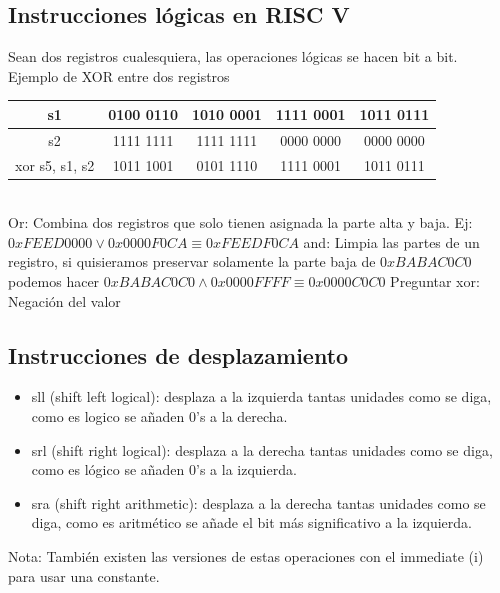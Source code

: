 \documentclass[10pt,a4paper]{article}
\begin{document}
\subsection*{Instrucciones lógicas en RISC V}
Sean dos registros cualesquiera, las operaciones lógicas se hacen bit a bit. \\
Ejemplo de XOR entre dos registros
\begin{table}[h!]
    \centering
    \begin{tabular}{|c | c | c | c| c|}
    \hline
    s1 & 0100 0110 & 1010 0001 & 1111 0001 & 1011 0111 \\ \hline
    s2 & 1111 1111 & 1111 1111 & 0000 0000 & 0000 0000 \\ \hline
    xor s5, s1, s2 & 1011 1001 & 0101 1110 & 1111 0001 & 1011 0111 \\
    \hline
    \end{tabular}
    \label{tab:xor}
\end{table} 
\\
Or: Combina dos registros que solo tienen asignada la parte alta y baja. Ej: \(0xFEED0000 \lor 0x0000F0CA \equiv 0xFEEDF0CA \)  
and: Limpia las partes de un registro, si quisieramos preservar solamente la parte baja de \(0xBABAC0C0\) podemos hacer \(0xBABAC0C0 \land 0x0000FFFF \equiv 0x0000C0C0\) Preguntar 
xor: Negación del valor
\subsection*{Instrucciones de desplazamiento}
\begin{itemize}
    \item sll (shift left logical): desplaza a la izquierda tantas unidades como se diga, como es logico se añaden 0's a la derecha.
    \item srl (shift right logical): desplaza a la derecha tantas unidades como se diga, como es lógico se añaden 0's a la izquierda.
    \item sra (shift right arithmetic): desplaza a la derecha tantas unidades como se diga, como es aritmético se añade el bit más significativo a la izquierda.
\end{itemize}
Nota: También existen las versiones de estas operaciones con el immediate (i) para usar una constante.
\end{document}
